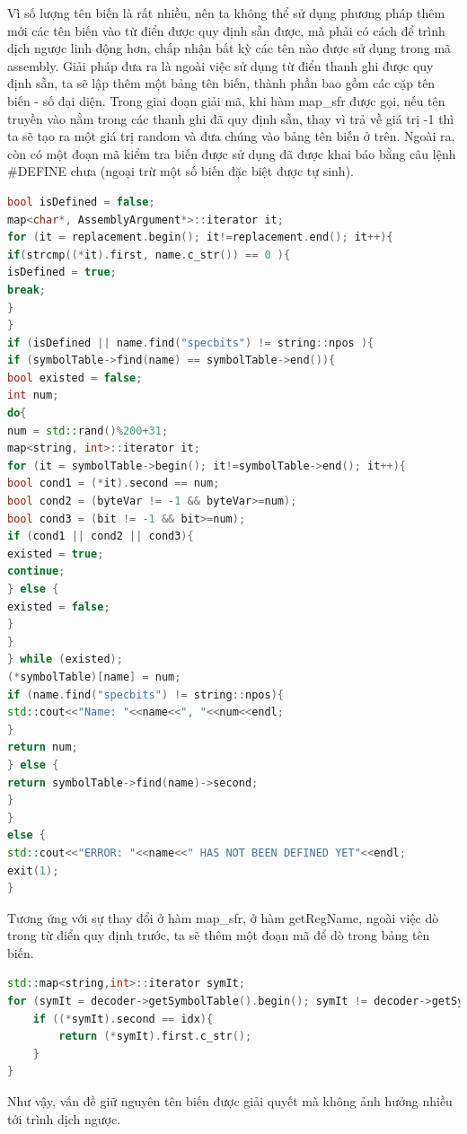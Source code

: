 Vì số lượng tên biến là rất nhiều, nên ta không thể sử dụng phương pháp thêm mới các tên biến vào từ điển được quy định sẵn được, mà phải có cách để trình dịch ngược linh động hơn, chấp nhận bất kỳ các tên nào được sử dụng trong mã assembly. Giải pháp đưa ra là ngoài việc sử dụng từ điển thanh ghi được quy định sẵn, ta sẽ lập thêm một bảng tên biến, thành phần bao gồm các cặp tên biến - số đại diện. Trong giai đoạn giải mã, khi hàm map\_sfr được gọi, nếu tên truyền vào nằm trong các thanh ghi đã quy định sẵn, thay vì trả về giá trị -1 thì ta sẽ tạo ra một giá trị random và đưa chúng vào bảng tên biến ở trên. Ngoài ra, còn có một đoạn mã kiểm tra biến được sử dụng đã được khai báo bằng câu lệnh \#DEFINE chưa (ngoại trừ một số biến đặc biệt được tự sinh). \\
\begin{lstlisting}[caption={Phần mã mới được bổ sung trong hàm map\_sfr},label={list:listmapsfrnew},language=c++]
bool isDefined = false;
map<char*, AssemblyArgument*>::iterator it;
for (it = replacement.begin(); it!=replacement.end(); it++){
if(strcmp((*it).first, name.c_str()) == 0 ){
isDefined = true;
break;
}
}
if (isDefined || name.find("specbits") != string::npos ){
if (symbolTable->find(name) == symbolTable->end()){
bool existed = false;
int num;
do{
num = std::rand()%200+31;
map<string, int>::iterator it;
for (it = symbolTable->begin(); it!=symbolTable->end(); it++){
bool cond1 = (*it).second == num;
bool cond2 = (byteVar != -1 && byteVar>=num);
bool cond3 = (bit != -1 && bit>=num);
if (cond1 || cond2 || cond3){
existed = true;
continue;
} else {
existed = false;
}
}
} while (existed); 
(*symbolTable)[name] = num;
if (name.find("specbits") != string::npos){
std::cout<<"Name: "<<name<<", "<<num<<endl;
}
return num;
} else {
return symbolTable->find(name)->second;
}
}
else {
std::cout<<"ERROR: "<<name<<" HAS NOT BEEN DEFINED YET"<<endl;
exit(1);
}
\end{lstlisting}
Tương ứng với sự thay đổi ở hàm map\_sfr,  ở hàm getRegName, ngoài việc dò trong từ điển quy định trước, ta sẽ thêm một đoạn mã để dò trong bảng tên biến. 
\begin{lstlisting}[caption={Phần mã mới được bổ sung trong hàm getRegName},label={list:listgetregnamenew},language=c++]
std::map<string,int>::iterator symIt;
for (symIt = decoder->getSymbolTable().begin(); symIt != decoder->getSymbolTable().end(); symIt++){
	if ((*symIt).second == idx){
		return (*symIt).first.c_str();
	}
}
\end{lstlisting}
Như vậy, vấn đề giữ nguyên tên biến được giải quyết mà không ảnh hưởng nhiều tới trình dịch ngược.
